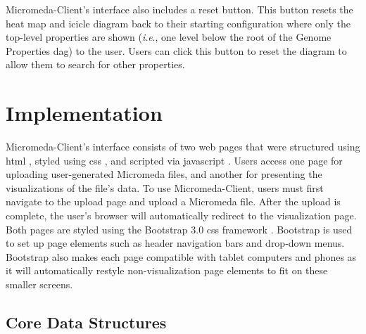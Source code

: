 Micromeda-Client's interface also includes a reset button. This button resets 
the heat map and icicle diagram back to their starting configuration where only 
the top-level properties are shown (\textit{i}.\textit{e}., one level below the 
root of the Genome Properties \gls{dag}) to the user. Users can click this button 
to reset the diagram to allow them to search for other properties.

\section{Implementation} \label{client-implementation}

Micromeda-Client's interface consists of two web pages that were structured 
using \gls{html} \cite{HTML5}, styled using \gls{css} \cite{CSS3}, and scripted 
via \gls{javascript} \cite{flanagan2006javascript}. Users access one page for 
uploading user-generated Micromeda files, and another for presenting the 
visualizations of the file's data. To use Micromeda-Client, users must first 
navigate to the upload page and upload a Micromeda file. After the upload is 
complete, the user's browser will automatically redirect to the visualization 
page. Both pages are styled using the Bootstrap 3.0 \gls{css} framework 
\cite{spurlock2013bootstrap}. Bootstrap is used to set up page elements such as 
header navigation bars and drop-down menus. Bootstrap also makes each page 
compatible with tablet computers and phones as it will automatically restyle 
non-visualization page elements to fit on these smaller screens.

\subsection{Core Data Structures} \label{visual-data-structures}


